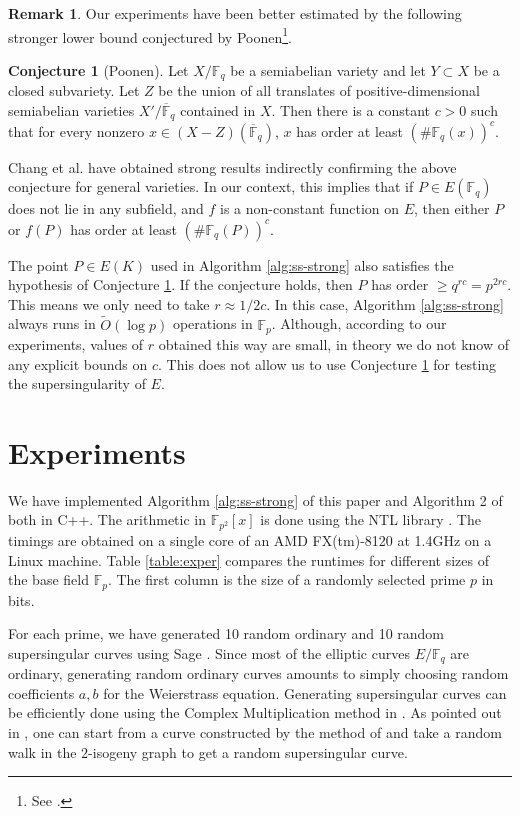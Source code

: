 \documentclass[12pt]{article}
\theoremstyle{plain}
\theoremstyle{definition}
\newtheorem{conjecture}[theorem]{Conjecture}
\newtheorem*{remark}{Remark}
\newcommand{\tildO}{\tilde{O}}
\def\F{\ensuremath{\mathbb{F}}}
\begin{document}
\begin{remark}
	Our experiments have been better estimated by the following stronger lower bound conjectured by 
	Poonen\footnote{See \cite{voloch2007}.}.
	\begin{conjecture}[Poonen]
		\label{conj:poonen}
		Let $X/\F_q$ be a semiabelian variety and let $Y \subset X$ be a closed subvariety. Let $Z$ 
		be the union of all translates of positive-dimensional semiabelian varieties $X' / 
		\overline{\F}_q$ contained in $X$. Then there is a constant $c > 0$ such that for every 
		nonzero $x \in (X - Z)(\overline{\F}_q)$, $x$ has order at least $(\#\F_q(x))^c$.
	\end{conjecture}
	Chang et al.\cite{chang2014} have obtained strong results indirectly confirming the above 
	conjecture for general varieties. In our context, this implies that if $P \in E(\F_q)$ does 
	not lie in any subfield, and $f$ is a non-constant function on $E$, then either $P$ or $f(P)$ 
	has order at least $(\#\F_q(P))^c$. 
	
	The point $P \in E(K)$ used in Algorithm \ref{alg:ss-strong} also satisfies the hypothesis of 
	Conjecture \ref{conj:poonen}. If the conjecture holds, then $P$ has order $\ge q^{rc} = 
	p^{2rc}$. This means we only need to take $r \approx 1 / 2c$. In this case, Algorithm 
	\ref{alg:ss-strong} always runs in $\tildO(\log p)$ operations in $\F_p$. Although, according 
	to our experiments, values of $r$ obtained this way are small, in theory we do not know of any 
	explicit bounds on $c$. This does not allow us to use Conjecture \ref{conj:poonen} for testing 
	the supersingularity of $E$.
\end{remark}




\section{Experiments}
\label{sec:exper}

We have implemented Algorithm \ref{alg:ss-strong} of this paper and Algorithm 2 of 
\cite{sutherland2012} both in C++. The arithmetic in $\F_{p^2}[x]$ is done using the NTL library 
\cite{shoup2001ntl}. The timings are obtained on a single core of an AMD FX(tm)-8120 at 1.4GHz on a 
Linux machine. Table \ref{table:exper} compares the runtimes for different sizes of the base field 
$\F_p$. The first column is the size of a randomly selected prime $p$ in bits. 

For each prime, we have generated 10 random ordinary and 10 random supersingular curves using Sage 
\cite{stein2008sage}. Since most of the elliptic curves $E/\F_q$ are ordinary, generating random 
ordinary curves amounts to simply choosing random coefficients $a, b$ for the Weierstrass equation. 
Generating supersingular curves can be efficiently done using the Complex Multiplication method in 
\cite{broker2009}. As pointed out in \cite{sutherland2012}, one can start from a curve constructed 
by the method of \cite{broker2009} and take a random walk in the $2$-isogeny graph to get a random 
supersingular curve.
\end{document}
